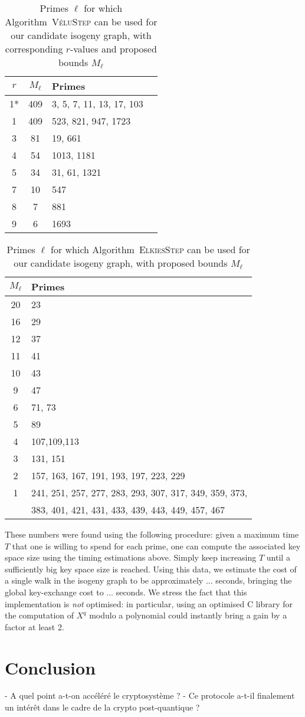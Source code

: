 \documentclass{article}
\newcommand{\algstyle}[1]{\textsc{#1}}
\theoremstyle{definition}
\begin{document}
\begin{table}
\centering
\begin{tabular}{cclc}
$r$ & $M_\ell$ & Primes \\
\hline
1* & 409 & 3, 5, 7, 11, 13, 17, 103 \\
1 & 409 & 523, 821, 947, 1723 \\
3 & 81 & 19, 661 \\
4 & 54 & 1013, 1181 \\
5 & 34 & 31, 61, 1321 \\
7 & 10 & 547 \\
8 & 7 & 881 \\
9 & 6 & 1693
\end{tabular}
    \caption{Primes $\ell$ for which Algorithm~\algstyle{VéluStep} can be
    used for our candidate isogeny graph,
    with corresponding $r$-values and proposed bounds $M_\ell$}
    \label{tab:VéluSteps}
\end{table}

\begin{table}
\begin{tabular}{cl}
$M_\ell$ & Primes \\
\hline
20 & 23  \\
16 & 29  \\
12 & 37  \\
11 & 41  \\
10 & 43  \\
9  & 47  \\
6  & 71, 73  \\
5  & 89  \\
4  & 107,109,113  \\
3  & 131, 151  \\
2  & 157, 163, 167, 191,
     193,
     197,
     223,
     229  \\
1 &  241,
     251,
     257,
     277,
     283,
     293,
     307,
     317,
     349,
     359,
     373,
	\\ &
     383,
     401,
     421,
     431,
     433,
     439,
     443,
     449,
     457,
     467 \\
\end{tabular}
    \caption{Primes $\ell$ for which Algorithm~\algstyle{ElkiesStep} can be
    used for our candidate isogeny graph, with proposed bounds $M_\ell$}
    \label{tab:ElkiesSteps}
\end{table}


These numbers were found using the following procedure: given a maximum time
$T$ that one is willing to spend for each prime, one can compute the
associated key space size using the timing estimations above. Simply keep
increasing $T$ until a sufficiently big key space size is reached.
Using this data, we estimate the cost of a single walk in the
isogeny graph to be approximately ... seconds, bringing the global
key-exchange cost to ... seconds. We stress the fact that this implementation
is \emph{not} optimised: in particular, using an optimised C library
for the computation of $X^q$ modulo a polynomial could instantly bring a
gain by a factor at least 2.


\section{Conclusion}

- A quel point a-t-on accéléré le cryptosystème ?
- Ce protocole a-t-il finalement un intérêt dans le cadre de la crypto post-quantique ?




\end{document}
